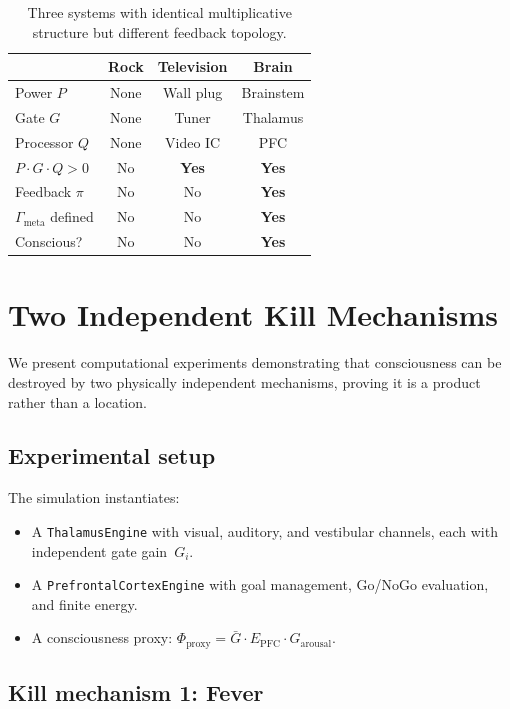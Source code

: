 \documentclass[aps,pre,twocolumn,superscriptaddress,floatfix]{revtex4-2}
\newcommand{\Gmeta}{\Gamma_{\text{meta}}}
\begin{document}
\begin{table}[h]
\centering
\caption{Three systems with identical multiplicative
structure but different feedback topology.}
\label{tab:three-systems}
\begin{tabular}{@{}lccc@{}}
\toprule
 & Rock & Television & Brain \\
\midrule
Power $P$ & None & Wall plug & Brainstem \\
Gate $G$ & None & Tuner & Thalamus \\
Processor $Q$ & None & Video IC & PFC \\
$P\!\cdot\!G\!\cdot\!Q > 0$ & No & \textbf{Yes} & \textbf{Yes} \\
Feedback $\pi$ & No & No & \textbf{Yes} \\
$\Gmeta$ defined & No & No & \textbf{Yes} \\
Conscious? & No & No & \textbf{Yes} \\
\bottomrule
\end{tabular}
\end{table}


\section{Two Independent Kill Mechanisms}
\label{sec:two-kills}

We present computational experiments demonstrating that
consciousness can be destroyed by two physically independent
mechanisms, proving it is a product rather than a location.

\subsection{Experimental setup}

The simulation instantiates:
\begin{itemize}
  \item A \texttt{ThalamusEngine} with visual, auditory, and
    vestibular channels, each with independent gate gain~$G_i$.
  \item A \texttt{PrefrontalCortexEngine} with goal management,
    Go/NoGo evaluation, and finite energy.
  \item A consciousness proxy:
    $\Phi_{\text{proxy}}=\bar{G}\cdot E_{\text{PFC}}\cdot
    G_{\text{arousal}}$.
\end{itemize}

\subsection{Kill mechanism 1: Fever}
\end{document}
